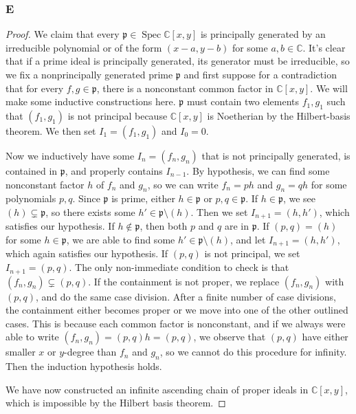 \documentclass{article}
\newcommand{\C}{\mathbb{C}}
\newcommand{\frkp}{\mathfrak{p}}
\DeclareMathOperator{\Spec}{\mathrm{Spec}}
\begin{document}
\subsubsection{E}\label{3.2.E}
\begin{proof}
    We claim that every $\frkp\in \Spec \C[x,y]$ is principally generated by an irreducible polynomial or of the form $(x-a, y-b)$ for some $a,b\in \C$. It's clear that if a prime ideal is principally generated, its generator must be irreducible, so we fix a nonprincipally generated prime $\frkp$ and first suppose for a contradiction that for every $f,g\in \frkp$, there is a nonconstant common factor in $\C[x,y]$. We will make some inductive constructions here. $\frkp$ must contain two elements $f_1,g_1$ such that $(f_1,g_1)$ is not principal because $\C[x,y]$ is Noetherian by the Hilbert-basis theorem. We then set $I_1 = (f_1, g_1)$ and $I_0=0$.

    Now we inductively have some $I_n= (f_n, g_n)$ that is not principally generated, is contained in $\frkp$, and properly contains $I_{n-1}$. By hypothesis, we can find some nonconstant factor $h$ of $f_n$ and $g_n$, so we can write $f_n = p h $ and $g_n = q h$ for some polynomials $p, q$. Since $\frkp$ is prime, either $h\in \frkp$ or $p,q\in \frkp$. If $h\in \frkp$, we see $(h)\subsetneq \frkp$, so there exists some $h'\in \frkp \setminus (h)$. Then we set $I_{n+1}=(h,h')$, which satisfies our hypothesis. If $h\notin \frkp$, then both $p$ and $q$ are in $\frkp$. If $(p,q)=(h)$ for some $h\in \frkp$, we are able to find some $h'\in \frkp\setminus (h)$, and let $I_{n+1}=(h,h')$, which again satisfies our hypothesis. If $(p,q)$ is not principal, we set $I_{n+1}=(p,q)$. The only non-immediate condition to check is that $(f_n,g_n)\subsetneq (p,q)$. If the containment is not proper, we replace $(f_n,g_n)$ with $(p,q)$, and do the same case division. After a finite number of case divisions, the containment either becomes proper or we move into one of the other outlined cases. This is because each common factor is nonconstant, and if we always were able to write $(f_n, g_n)=(p,q)h=(p,q)$, we observe that $(p,q)$ have either smaller $x$ or $y$-degree than $f_n$ and $g_n$, so we cannot do this procedure for infinity. Then the induction hypothesis holds.

    We have now constructed an infinite ascending chain of proper ideals in $\C[x,y]$, which is impossible by the Hilbert basis theorem.


\end{proof}
\end{document}
